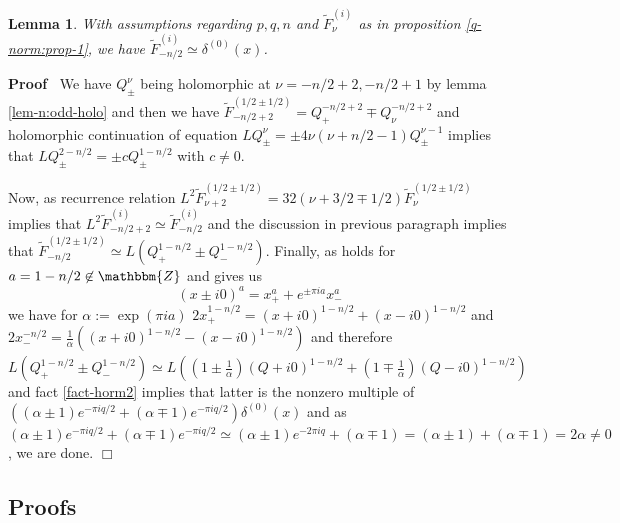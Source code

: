 \documentclass{article}
\newcommand{\assign}{:=}
\newcommand{\nin}{\not\in}
\newenvironment{proof}{\noindent\textbf{Proof\ }}{\hspace*{\fill}$\Box$\medskip}
\numberwithin{definition}{section}
\newtheorem{lemma}{Lemma}
\numberwithin{lemma}{section}
\numberwithin{proposition}{section}
{\theorembodyfont{\rmfamily}\newtheorem{remark}{Remark}
\numberwithin{remark}{section}
}
\begin{document}
\begin{lemma}
  \label{lem-n:odd-n/2}With assumptions regarding $p, q, n$ and
  $\tilde{F}_{\nu}^{( i)}$ as in proposition \ref{q-norm:prop-1}, we have
  $\tilde{F}^{( i)}_{- n / 2} \simeq \delta^{( 0)} ( x)$.
\end{lemma}

\begin{proof}
  We have $Q_{\pm}^{\nu}$ being holomorphic at $\nu = - n / 2 + 2, - n / 2 +
  1$ by lemma \ref{lem-n:odd-holo} and then we have $\tilde{F}_{- n / 2 +
  2}^{( 1 / 2 \pm 1 / 2)} = Q_+^{- n / 2 + 2} \mp Q_{\nu}^{- n / 2 + 2}$ and
  holomorphic continuation of equation $L Q_{\pm}^{\nu} = \pm 4 \nu ( \nu + n
  / 2 - 1) Q_{\pm}^{\nu - 1}$ implies that $L Q_{\pm}^{2 - n / 2} = \pm c
  Q_{\pm}^{1 - n / 2}$ with $c \neq 0$.
  
  Now, as recurrence relation $L^2 \tilde{F}_{\nu + 2}^{( 1 / 2 \pm 1 / 2)} =
  32 ( \nu + 3 / 2 \mp 1 / 2) \tilde{F}_{\nu}^{( 1 / 2 \pm 1 / 2)}$ implies
  that $L^2 \tilde{F}_{- n / 2 + 2}^{( i)} \simeq \tilde{F}_{- n / 2}^{( i)}$
  and the discussion in previous paragraph implies that $\tilde{F}^{( 1 / 2
  \pm 1 / 2)}_{- n / 2} \simeq L ( Q_+^{1 - n / 2} \pm Q_-^{1 - n / 2})$.
  Finally, as {\cite[eq. 3.2.9]{hormander1983analysis}} holds for $a = 1 - n /
  2 \nin \mathbbm{Z}$ and gives us
  \[ ( x \pm i 0)^a = x_+^a + e^{\pm \pi i a} x_-^a \]
  we have for $\alpha \assign \exp ( \pi i a)$ $2 x^{1 - n / 2}_+ = ( x + i
  0)^{1 - n / 2} + ( x - i 0)^{1 - n / 2}$ and $2 x_-^{- n / 2} =
  \frac{1}{\alpha} ( ( x + i 0)^{1 - n / 2} - ( x - i 0)^{1 - n / 2})_{}$ and
  therefore $L ( Q_+^{1 - n / 2} \pm Q_-^{1 - n / 2}) \simeq L \left( \left( 1
  \pm \frac{1}{\alpha} \right) ( Q + i 0)^{1 - n / 2} + \left( 1 \mp
  \frac{1}{\alpha} \right) ( Q - i 0)^{1 - n / 2} \right)$ and fact
  \ref{fact-horm2} implies that latter is the nonzero multiple of $( ( \alpha
  \pm 1) e^{- \pi i q / 2} + ( \alpha \mp 1) e^{- \pi i q / 2}) \delta^{( 0)}
  ( x)$ and as $( \alpha \pm 1) e^{- \pi i q / 2} + ( \alpha \mp 1) e^{- \pi i
  q / 2} \simeq ( \alpha \pm 1) e^{- 2 \pi i q} + ( \alpha \mp 1) = ( \alpha
  \pm 1) + ( \alpha \mp 1) = 2 \alpha \neq 0$, we are done.
\end{proof}

\subsection{Proofs}
\end{document}
